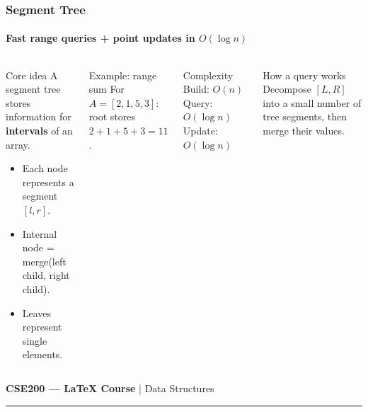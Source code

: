 \documentclass[aspectratio=169]{beamer}
\begin{document}
\begin{frame}[t]
\frametitle{Segment Tree}
\framesubtitle{Fast range queries + point updates in $O(\log n)$}

\begin{columns}[T,totalwidth=\textwidth]
\begin{block}{Core idea}
A segment tree stores information for \textbf{intervals} of an array.
\begin{itemize}\itemsep3pt
  \item Each node represents a segment $[l,r]$.
  \item Internal node = merge(left child, right child).
  \item Leaves represent single elements.
\end{itemize}
\end{block}

\vspace{5pt}
\begin{exampleblock}{Example: range sum}
For $A=[2,1,5,3]$:\\[-2pt]
root stores $2+1+5+3=11$.
\end{exampleblock}

\vspace{4pt}
\begin{alertblock}{Complexity}
Build: $O(n)$ \quad Query: $O(\log n)$ \quad Update: $O(\log n)$
\end{alertblock}

\centering
{}

\vspace{2pt}
\begin{block}{How a query works}
Decompose $[L,R]$ into a small number of tree segments, then merge their values.
\end{block}

\end{columns}

\vfill
\begin{center}
\footnotesize\textcolor{navy!70}{\textbf{CSE200 — LaTeX Course} \hspace{8pt}|\hspace{8pt} Data Structures}\qquad
\textcolor{gold}{\rule{34pt}{1.4pt}}
\end{center}
\end{frame}
\end{document}
